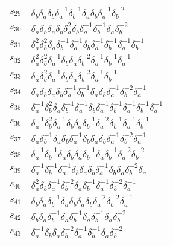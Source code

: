 \documentclass{article}
\begin{document}
\begin{center}
\begin{tabular}{ll}
$s_{29}$ & $\delta_b^{}\delta_a^{}\delta_b^{}\delta_a^{-1}\delta_b^{-1}\delta_a^{}\delta_b^{}\delta_a^{-1}\delta_b^{-2}$ \\
$s_{30}$ & $\delta_a^{}\delta_b^{}\delta_a^{}\delta_b^{}\delta_a^{2}\delta_b^{}\delta_a^{-1}\delta_b^{-1}\delta_a^{}\delta_b^{-2}$ \\
$s_{31}$ & $\delta_a^{2}\delta_b^{2}\delta_a^{}\delta_b^{-1}\delta_a^{-1}\delta_b^{}\delta_a^{-1}\delta_b^{-1}\delta_a^{-1}\delta_b^{-1}$ \\
$s_{32}$ & $\delta_a^{2}\delta_b^{2}\delta_a^{-1}\delta_b^{}\delta_a^{}\delta_b^{-2}\delta_a^{-1}\delta_b^{-1}\delta_a^{-1}$ \\
$s_{33}$ & $\delta_a^{}\delta_b^{2}\delta_a^{-1}\delta_b^{}\delta_a^{}\delta_b^{-2}\delta_a^{-1}\delta_b^{-1}$ \\
$s_{34}$ & $\delta_a^{}\delta_b^{}\delta_a^{}\delta_b^{}\delta_a^{-1}\delta_b^{-1}\delta_a^{}\delta_b^{}\delta_a^{-1}\delta_b^{-2}\delta_a^{-1}$ \\
$s_{35}$ & $\delta_a^{-1}\delta_b^{2}\delta_a^{}\delta_b^{-1}\delta_a^{-1}\delta_b^{}\delta_a^{-1}\delta_b^{-1}\delta_a^{-1}\delta_b^{-1}\delta_a^{-1}$ \\
$s_{36}$ & $\delta_a^{-1}\delta_b^{2}\delta_a^{-1}\delta_b^{}\delta_a^{}\delta_b^{-1}\delta_a^{-2}\delta_b^{-1}\delta_a^{-1}\delta_b^{-1}$ \\
$s_{37}$ & $\delta_a^{}\delta_b^{-1}\delta_a^{}\delta_b^{}\delta_a^{-1}\delta_b^{}\delta_a^{}\delta_b^{}\delta_a^{-1}\delta_b^{-2}\delta_a^{-1}$ \\
$s_{38}$ & $\delta_a^{-1}\delta_b^{-1}\delta_a^{}\delta_b^{}\delta_a^{}\delta_b^{-1}\delta_a^{}\delta_b^{-1}\delta_a^{-2}\delta_b^{-2}$ \\
$s_{39}$ & $\delta_a^{-1}\delta_b^{-1}\delta_a^{-1}\delta_b^{}\delta_a^{}\delta_b^{}\delta_a^{-1}\delta_b^{}\delta_a^{}\delta_b^{-2}\delta_a^{}$ \\
$s_{40}$ & $\delta_a^{2}\delta_b^{}\delta_a^{-1}\delta_b^{-2}\delta_a^{}\delta_b^{-1}\delta_a^{-1}\delta_b^{-2}\delta_a^{-1}$ \\
$s_{41}$ & $\delta_b^{}\delta_a^{}\delta_b^{-1}\delta_a^{}\delta_b^{}\delta_a^{}\delta_b^{}\delta_a^{-2}\delta_b^{-2}\delta_a^{-1}$ \\
$s_{42}$ & $\delta_b^{}\delta_a^{}\delta_b^{-1}\delta_a^{}\delta_b^{-1}\delta_a^{}\delta_b^{-1}\delta_a^{}\delta_b^{-2}$ \\
$s_{43}$ & $\delta_a^{-1}\delta_b^{}\delta_a^{}\delta_b^{-2}\delta_a^{-1}\delta_b^{-1}\delta_a^{}\delta_b^{-2}$ \\

\end{tabular}
\end{center}
\end{document}
